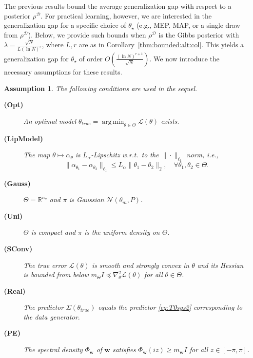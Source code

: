 \documentclass{article}
\newcommand{\train}{\mathcal{D}}
\DeclareMathOperator*{\argmin}{arg\,min}
\newtheorem{assumption}[theorem]{Assumption}
\newcommand{\w}{\mathbf{w}}
\begin{document}
The previous results bound the average generalization gap with respect to a posterior $\rho^{\train}$. For practical learning, however, we are interested in the generalization gap for a specific choice of $\theta_{\star}$ (e.g., MEP, MAP, or a single draw from $\rho^{\train}$). Below, we provide such bounds when $\rho^{\train}$ is the Gibbs posterior with $\lambda = \frac{\sqrt{N}}{L(\ln N)^r}$, where $L, r$ are as in Corollary~\ref{thm:bounded:alt:col}. This yields a generalization gap for $\theta_{\star}$ of order $O\left(\frac{(\ln N)^{r+1}}{\sqrt{N}}\right)$.
 We now introduce the necessary assumptions for these results.
\begin{assumption}
\label{as:oracle}
The following conditions are used in the sequel.

\begin{description}
    \item[\textbf{(Opt)}]
    An optimal model $\theta_{true} = \argmin_{\theta \in \Theta} \mathcal{L}(\theta)$ exists.

    \item[\textbf{(LipModel)}]
    The map $\theta \mapsto \alpha_{\theta}$ is $L_{\alpha}$-Lipschitz w.r.t.\
    to the $\|\cdot\|_{\ell_1}$ norm, i.e.,
    \[
        \|\alpha_{\theta_1}-\alpha_{\theta_2}\|_{\ell_1}
        \le L_{\alpha}\|\theta_1-\theta_2\|_2,
        \quad \forall \theta_1,\theta_2 \in \Theta.
    \]

    \item[\textbf{(Gauss)}]
    $\Theta=\mathbb{R}^{n_{\theta}}$ and $\pi$ is Gaussian
    $\mathcal{N}(\theta_m,P)$.

    \item[\textbf{(Uni)}]
    $\Theta$ is compact and $\pi$ is the uniform density on $\Theta$.

    \item[\textbf{(SConv)}]
    The true error $\mathcal{L}(\theta)$ is smooth and strongly convex
    in $\theta$ and its Hessian is bounded from below
    $m_{\Theta}I \preceq \nabla^2_{\theta}\mathcal{L}(\theta)$
    for all $\theta \in \Theta$.

    \item[\textbf{(Real)}]
    The predictor $\Sigma(\theta_{true})$ equals the predictor
    \eqref{eq:T0sys2} corresponding to the data generator.

    \item[\textbf{(PE)}]
    The spectral density $\Phi_{\w}$ of $\w$ satisfies
    $\Phi_{\w}(iz) \ge m_{\w} I$ for all $z \in [-\pi,\pi]$.
\end{description}
\end{assumption}
\end{document}
